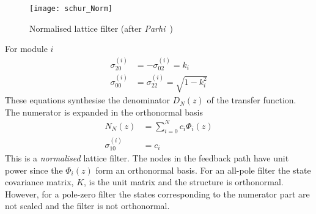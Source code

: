 \documentclass[a4paper,twoside,10pt,english]{report}
\begin{document}
\begin{figure}[!htbp]
\begin{center}
\texttt{[image: schur\_Norm]}
\caption{Normalised lattice filter (after 
\emph{Parhi}~\cite[Fig. 12.20]{Parhi_VLSIDigitalSignalProcessingSystems})}
\label{fig:Normalised-lattice-filter}
\end{center}
\end{figure}
For module $i$ 
\begin{align*}
\sigma_{20}^{(i)} & = -\sigma_{02}^{(i)}=k_{i}\\
\sigma_{00}^{(i)} & = \sigma_{22}^{(i)}=\sqrt{1-k_{i}^{2}}
\end{align*}
These equations synthesise the denominator $D_{N}\left(z\right)$ of the transfer
function. The numerator is expanded in the orthonormal basis
\begin{align*}
N_{N}\left(z\right) & = \sum_{i=0}^{N}c_{i}\Phi_{i}\left(z\right)\\
\sigma_{10}^{(i)} & = c_{i}
\end{align*}
This is a \emph{normalised} lattice filter. The nodes in the feedback
path have unit power since the $\Phi_{i}\left(z\right)$ form an orthonormal
basis. For an all-pole filter the state covariance matrix, $K$, is
the unit matrix and the structure is orthonormal. However, for a pole-zero
filter the states corresponding to the numerator part are not scaled
and the filter is not orthonormal.
\end{document}
